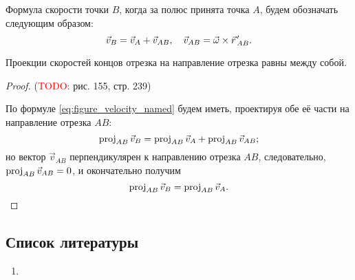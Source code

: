 Формула скорости точки $B$, когда за полюс принята точка $A$, будем обозначать
следующим образом:
\begin{equation}
  \label{eq:figure_velocity_named}
  \vec{v}_B = \vec{v}_A + \vec{v}_{AB}, \quad \vec{v}_{AB} =
    \crossprod{\vec{\omega}}{\pvec{r}_{AB}}.
\end{equation}

\begin{theorem}
  Проекции скоростей концов отрезка на направление отрезка равны между собой.
\end{theorem}

\begin{proof}
  (\textcolor{red}{TODO:} рис. 155, стр. 239)

  По формуле \ref{eq:figure_velocity_named} будем иметь, проектируя обе её части
  на направление отрезка $AB$:
  \begin{equation*}
    \operatorname{proj}_{AB} \vec{v}_B = \operatorname{proj}_{AB} \vec{v}_A + \operatorname{proj}_{AB} \vec{v}_{AB};
  \end{equation*}
  но вектор $\vec{v}_{AB}$ перпендикулярен к направлению отрезка $AB$,
  следовательно, $\operatorname{proj}_{AB} \vec{v}_{AB} = 0$, и окончательно получим
  \begin{equation*}
    \operatorname{proj}_{AB} \vec{v}_B = \operatorname{proj}_{AB} \vec{v}_A.
  \end{equation*}
\end{proof}

\subsection{Список литературы}
\begin{enumerate}
  \item \cite{lourie}
\end{enumerate}

